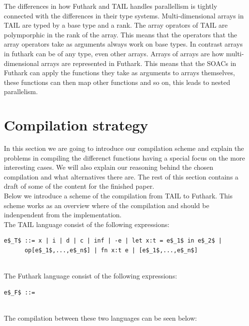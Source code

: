 \documentclass[11pt]{article}
\begin{document}
The differences in how Futhark and TAIL handles parallellism is tightly connected with the differences in their type systems.
Multi-dimensional arrays in TAIL are typed by a base type and a rank. The array oprators of TAIL are polymporphic in the rank
of the array. This means that the operators that the array operators take as arguments always work on base types. In contrast
arrays in futhark can be of any type, even other arrays. Arrays of arrays are how multi-dimensional arrays are represented in Futhark.
This means that the SOACs in Futhark can apply the functions they take as arguments to arrays themselves, these functions can then
map other functions and so on, this leads to nested parallelism.

\section{Compilation strategy}
In this section we are going to introduce our compilation scheme and explain the problems in compiling the differenct functions having a special focus on the more interesting cases. We will also explain our reasoning behind the chosen compilation and what alternatives there are. The rest of this section contains a draft of some of the content for the finished paper.\\

Below we introduce a scheme of the compilation from TAIL to Futhark. This scheme works as an overview where
of the compilation and should be indenpendent from the implementation. \\

The TAIL language consist of the following expressions: 

\begin{lstlisting}[numbers=none,frame=none]
e$_T$ ::= x | i | d | c | inf | -e | let x:t = e$_1$ in e$_2$ |
      op[e$_1$,...,e$_n$] | fn x:t e | [e$_1$,...,e$_n$]
      
\end{lstlisting}

The Futhark language consist of the following expressions: 
\begin{lstlisting}[numbers=none,frame=none]
e$_F$ ::= 
      
\end{lstlisting}

The compilation between these two languages can be seen below: \\
\end{document}
